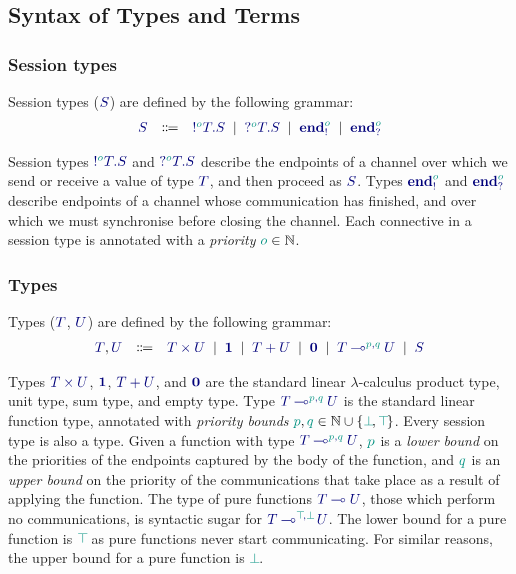 \subsection{Syntax of Types and Terms}
\subsubsection*{Session types}
Session types ($\ty{S}$) are defined by the following grammar:
\[
  \begin{array}{lcl}
    \ty{S}
     & \Coloneqq & \ty{\tysend[\cs{o}]{T}{S}}
    \sep        \ty{\tyrecv[\cs{o}]{T}{S}}
    \sep        \ty{\tyends[\cs{o}]}
    \sep        \ty{\tyendr[\cs{o}]}
  \end{array}
\]

Session types $\ty{\tysend[\cs{o}]{T}{S}}$ and $\ty{\tyrecv[\cs{o}]{T}{S}}$ describe the endpoints of a channel over which we send or receive a value of type $\ty{T}$, and then proceed as $\ty{S}$. Types $\ty{\tyends[\cs{o}]}$ and $\ty{\tyendr[\cs{o}]}$ describe endpoints of a channel whose communication has finished, and over which we must synchronise before closing the channel. Each connective in a session type is annotated with a \emph{priority} $\cs{o}\in\mathbb{N}$.

\subsubsection*{Types}
Types ($\ty{T}$, $\ty{U}$) are defined by the following grammar:
\[
  \begin{array}{lcl}
    \ty{T}, \ty{U}
     & \Coloneqq & \ty{\typrod{T}{U}}
    \sep        \ty{\tyunit}
    \sep        \ty{\tysum{T}{U}}
    \sep        \ty{\tyvoid}
    \sep        \ty{\tylolli[\cs{p},\cs{q}]{T}{U}}
    \sep        \ty{S}
  \end{array}
\]

Types $\ty{\typrod{T}{U}}$, $\ty{\tyunit}$, $\ty{\tysum{T}{U}}$, and $\ty{\tyvoid}$ are the standard linear $\lambda$-calculus product type, unit type, sum type, and empty type.
Type $\ty{\tylolli[\cs{p},\cs{q}]{T}{U}}$ is the standard linear function type, annotated with \emph{priority bounds} $\cs{p},\cs{q}\in\mathbb{N}\cup\{\cs{\pbot},\cs{\ptop}\}$.
Every session type is also a type.
Given a function with type $\ty{\tylolli[\cs{p},\cs{q}]{T}{U}}$, $\cs{p}$ is a \emph{lower bound} on the priorities of the endpoints captured by the body of the function, and $\cs{q}$ is an \emph{upper bound} on the priority of the communications that take place as a result of applying the function. The type of {pure functions} $\ty{\tylolli{T}{U}}$, \ie those which perform no communications, is syntactic sugar for $\ty{\tylolli[\cs{\ptop},\cs{\pbot}]{T}{U}}$. The lower bound for a pure function is $\cs{\ptop}$ as pure functions never start communicating. For similar reasons, the upper bound for a pure function is $\cs{\pbot}$.

